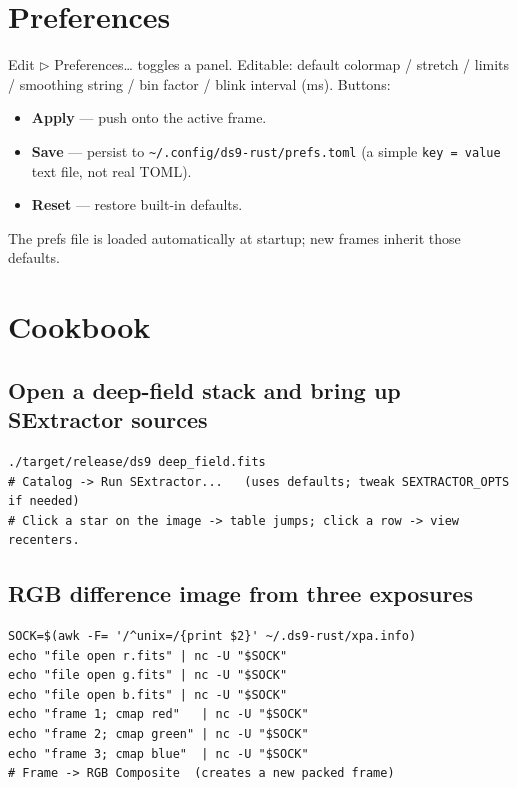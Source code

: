 \documentclass[11pt,a4paper]{article}
\begin{document}
\section{Preferences}

\textsf{Edit $\triangleright$ Preferences\dots} toggles a panel. Editable:
default colormap / stretch / limits / smoothing string / bin factor /
blink interval (ms). Buttons:

\begin{itemize}
\item \textbf{Apply} --- push onto the active frame.
\item \textbf{Save}  --- persist to \texttt{\textasciitilde/.config/ds9-rust/prefs.toml}
       (a simple \texttt{key = value} text file, not real TOML).
\item \textbf{Reset} --- restore built-in defaults.
\end{itemize}

The prefs file is loaded automatically at startup; new frames inherit
those defaults.

\section{Cookbook}

\subsection*{Open a deep-field stack and bring up SExtractor sources}

\begin{lstlisting}[language=shell]
./target/release/ds9 deep_field.fits
# Catalog -> Run SExtractor...   (uses defaults; tweak SEXTRACTOR_OPTS if needed)
# Click a star on the image -> table jumps; click a row -> view recenters.
\end{lstlisting}

\subsection*{RGB difference image from three exposures}

\begin{lstlisting}[language=shell]
SOCK=$(awk -F= '/^unix=/{print $2}' ~/.ds9-rust/xpa.info)
echo "file open r.fits" | nc -U "$SOCK"
echo "file open g.fits" | nc -U "$SOCK"
echo "file open b.fits" | nc -U "$SOCK"
echo "frame 1; cmap red"   | nc -U "$SOCK"
echo "frame 2; cmap green" | nc -U "$SOCK"
echo "frame 3; cmap blue"  | nc -U "$SOCK"
# Frame -> RGB Composite  (creates a new packed frame)
\end{lstlisting}
\end{document}
